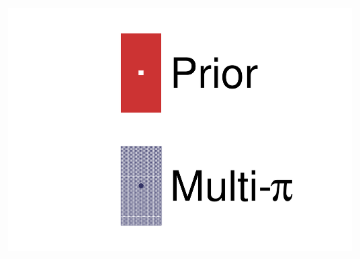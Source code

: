 \begin{figure}[h]
\begin{subfigure}[t]{0.32\textwidth}
		\includegraphics[width=\textwidth,page=35, trim={0mm 0mm 0mm 0mm}, clip]{figures/mach3/2018/data/2018a_FixedCov_RedCov_Mpi_Data_merge_drawPar_withDet}
	\end{subfigure}
	

\end{figure}
